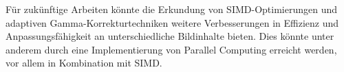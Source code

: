 \documentclass[course=erap]{aspdoc}
\begin{document}
Für zukünftige Arbeiten könnte die Erkundung von SIMD-Optimierungen und adaptiven Gamma-Korrekturtechniken weitere Verbesserungen in Effizienz und Anpassungsfähigkeit an unterschiedliche Bildinhalte bieten. Dies könnte unter anderem durch eine Implementierung von Parallel Computing erreicht werden, vor allem in Kombination mit SIMD.


{}
\end{document}
